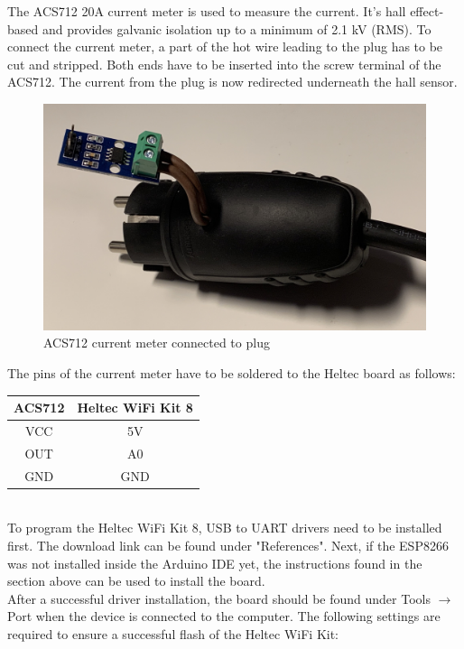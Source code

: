 The ACS712 20A current meter is used to measure the current. It's hall effect-based and provides galvanic isolation up to a minimum of 2.1 kV (RMS)\cite{acs712}. To connect the current meter, a part of the hot wire leading to the plug has to be cut and stripped. Both ends have to be inserted into the screw terminal of the ACS712. The current from the plug is now redirected underneath the hall sensor.
\\
\begin{figure}[H]
    \includegraphics[width=\textwidth]{img/acs712.jpg}
    \caption{ACS712 current meter connected to plug}
    \label{fig:acs712}
\end{figure}

The pins of the current meter have to be soldered to the Heltec board as follows:
\\
\begin{center}
    \begin{tabular} { |c|c| }
        \hline
        ACS712 & Heltec WiFi Kit 8 \\
        \hline\hline
        VCC & 5V \\
        \hline
        OUT & A0 \\
        \hline
        GND & GND \\
        \hline
    \end{tabular}
    \label{tab:currentmeter}
\end{center}
\leavevmode
\\
To program the Heltec WiFi Kit 8, USB to UART drivers need to be installed first. The download link can be found under "References"\cite{vcp-drivers}. Next, if the ESP8266 was not installed inside the Arduino IDE yet, the instructions found in the section above can be used to install the board.
\\
After a successful driver installation, the board should be found under Tools $\rightarrow$ Port when the device is connected to the computer.
\newpage
The following settings are required to ensure a successful flash of the Heltec WiFi Kit:

